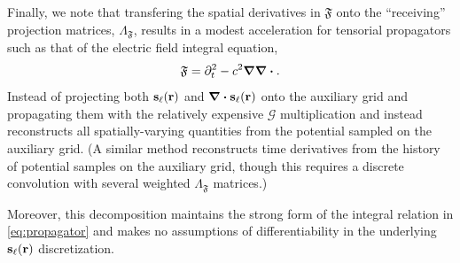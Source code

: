 Finally, we note that transfering the spatial derivatives in $\mathfrak{F}$ onto the ``receiving'' projection matrices, $\Lambda_\mathfrak{F}$, results in a modest acceleration for tensorial propagators such as that of the electric field integral equation,
\begin{equation}
  \mathfrak{F} = \partial_t^2 -c^2 \grad \grad \boldsymbol{\cdot}.
\end{equation}
Instead of projecting both $\vb{s}_\ell(\vb{r})$ and $\div{\vb{s}_\ell(\vb{r})}$ onto the auxiliary grid and propagating them with the relatively expensive $\mathcal{G}$ multiplication and instead reconstructs all spatially-varying quantities from the potential sampled on the auxiliary grid.
(A similar method reconstructs time derivatives from the history of potential samples on the auxiliary grid, though this requires a discrete convolution with several weighted $\Lambda_\mathfrak{F}$ matrices.)

Moreover, this decomposition maintains the strong form of the integral relation in \cref{eq:propagator} and makes no assumptions of differentiability in the underlying $\vb{s}_\ell(\vb{r})$ discretization.

